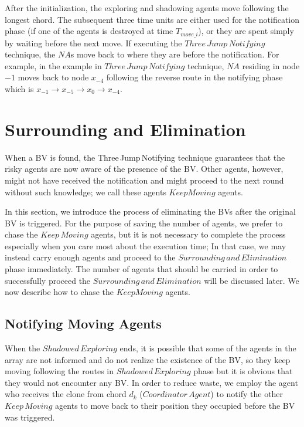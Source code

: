 
After the initialization, the exploring and shadowing agents move   following the longest chord. The subsequent three time units are either used for the notification phase (if one of the agents is destroyed at  time $T_{move\_i}$), or they are spent simply by waiting before the next move.
If  executing the $Three\,Jump\,Notifying$ technique,  the $NA$s move  back to where they are before the notification. For example, in the example in $Three\,Jump\,Notifying$ technique, $NA$ residing in node $-1$ moves back to node $x_{-4}$ following the reverse route in the notifying phase which is $x_{-1}{\rightarrow}x_{-5}{\rightarrow}x_0{\rightarrow}x_{-4}$. 

\section{Surrounding and Elimination}
 When a BV is found,  the Three\,Jump\,Notifying technique   guarantees that the risky agents are now aware of the presence of the BV. Other agents, however, might not have received the notification and might proceed to the next round without such knowledge; we call these agents $KeepMoving$ agents.   

In this section, we introduce the process of eliminating the BVs after the original BV is triggered. For the purpose of saving the number of agents, we prefer to chase the $Keep\,Moving$ agents, but it is not necessary to complete the process especially when you care most about the  execution time; In that case, we may  instead  carry enough agents  and  proceed to the $Surrounding\,and\,Elimination$ phase immediately. 
The number of agents that should be carried in order to successfully proceed the $Surrounding\,and\,Elimination$ will be discussed later.  We now describe how to chase the $KeepMoving$ agents.

\subsection{Notifying Moving Agents}


When the $Shadowed\,Exploring$ ends, it is possible that some of the agents in the array are not informed and do not realize the existence of the BV, so they keep moving following the routes in $Shadowed\,Exploring$  phase but it is obvious that they would not encounter any BV. In order to reduce waste, we employ the agent who receives the clone from chord $d_k$ ($Coordinator\,Agent$) to notify the other $Keep\,Moving$ agents to move back to their   position  they occupied before the BV was triggered.


